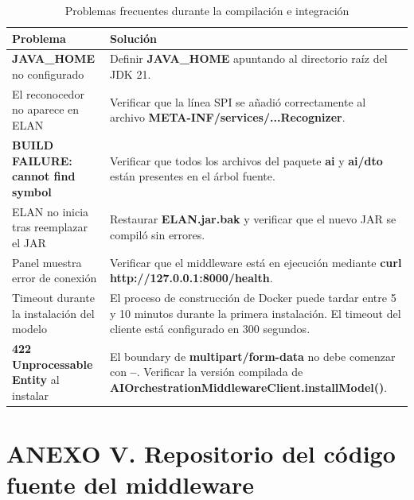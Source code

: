 \documentclass[11pt,a4paper]{article}
\begin{document}
\begin{table}[H]
\centering
\caption{Problemas frecuentes durante la compilación e integración}
\label{tab:troubleshooting}
\scriptsize
\renewcommand{\arraystretch}{1.08}
\setlength{\tabcolsep}{4pt}

\begin{tabular}{
    >{\raggedright\arraybackslash}p{4.7cm}
    >{\raggedright\arraybackslash}p{8.4cm}
}
\toprule
\textbf{Problema} & \textbf{Solución} \\
\midrule
\textbf{JAVA\_HOME} no configurado &
Definir \textbf{JAVA\_HOME} apuntando al directorio raíz del JDK 21. \\

El reconocedor no aparece en ELAN &
Verificar que la línea SPI se añadió correctamente al archivo \textbf{META-INF/services/...Recognizer}. \\

\textbf{BUILD FAILURE: cannot find symbol} &
Verificar que todos los archivos del paquete \textbf{ai} y \textbf{ai/dto} están presentes en el árbol fuente. \\

ELAN no inicia tras reemplazar el JAR &
Restaurar \textbf{ELAN.jar.bak} y verificar que el nuevo JAR se compiló sin errores. \\

Panel muestra error de conexión &
Verificar que el middleware está en ejecución mediante \textbf{curl http://127.0.0.1:8000/health}. \\

Timeout durante la instalación del modelo &
El proceso de construcción de Docker puede tardar entre 5 y 10 minutos durante la primera instalación. El timeout del cliente está configurado en 300 segundos. \\

\textbf{422 Unprocessable Entity} al instalar &
El boundary de \textbf{multipart/form-data} no debe comenzar con \textbf{--}. Verificar la versión compilada de \textbf{AIOrchestrationMiddlewareClient.installModel()}. \\
\bottomrule
\end{tabular}
\end{table}


\section*{\normalfont ANEXO V. Repositorio del código fuente del middleware}
\label{anx:repo_middleware}
\end{document}
